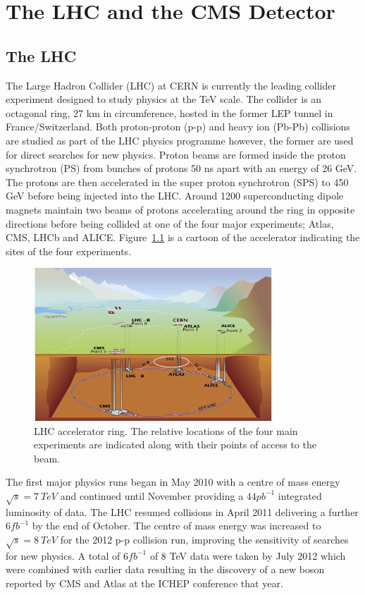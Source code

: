 \chapter{The LHC and the CMS Detector}
\label{detector}
\section{The LHC}
The Large Hadron Collider (LHC) at CERN is currently the leading collider experiment designed 
to study physics at the TeV scale. The collider is an octagonal 
ring, 27 km in circumference, hosted in the former LEP tunnel in France/Switzerland.  
Both proton-proton (p-p) and heavy ion (Pb-Pb) collisions are
studied as part of the LHC physics programme however, the former are used 
for direct searches for new physics. Proton beams are formed inside the proton synchrotron (PS)
from bunches of protons 50 ns apart with an energy of 26 GeV. The protons are then accelerated in the 
super proton synchrotron (SPS) to 450 GeV before being injected into the LHC. 
Around 1200 superconducting dipole magnets maintain two beams of protons accelerating around 
the ring in opposite directions before being collided at one of the four major experiments;
Atlas, CMS, LHCb and ALICE.
Figure~\ref{fig:lhcring} is a cartoon of the accelerator indicating the sites of the
four experiments.

\begin{figure}[htb!]
\begin{center}
\includegraphics[width=0.8\textwidth]{detector/CERN.jpg}
\caption{LHC accelerator ring. The relative locations of the four main experiments 
are indicated along with their points of access to the beam.}
\label{fig:lhcring}
\end{center}
\end{figure}

The first major physics runs began in May 2010 with a centre of mass energy 
$\sqrt{s}=7~TeV$ and continued until November providing a $44pb^{-1}$ integrated luminosity of data.
The LHC resumed collisions in April 2011 delivering a further $6fb^{-1}$ by the end
of October. The centre of mass energy was increased to $\sqrt{s}=8~TeV$ for the 2012 p-p 
collision run, improving the sensitivity of searches for new physics. A total of
$6fb^{-1}$ of 8 TeV data were taken by July 2012 which were combined with earlier data resulting
in the discovery of a new boson reported by CMS and Atlas at the ICHEP conference that year. 

